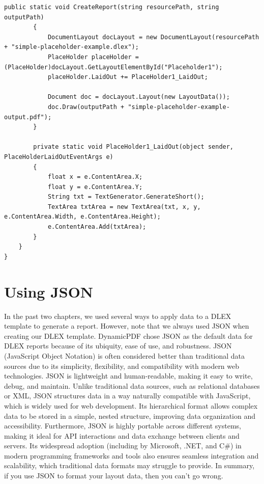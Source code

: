 \documentclass[american]{tufte-book}
\numberwithin{equation}{section}
\numberwithin{figure}{section}
\begin{document}
{{\begin{lstlisting}[caption={Report with placeholder.},label={lis:Report-with-placeholder.},basicstyle={\footnotesize\ttfamily},breaklines=true]
        public static void CreateReport(string resourcePath, string outputPath)
        {
            DocumentLayout docLayout = new DocumentLayout(resourcePath + "simple-placeholder-example.dlex");
            PlaceHolder placeHolder = (PlaceHolder)docLayout.GetLayoutElementById("Placeholder1");
            placeHolder.LaidOut += PlaceHolder1_LaidOut;
            
            Document doc = docLayout.Layout(new LayoutData());
            doc.Draw(outputPath + "simple-placeholder-example-output.pdf");
        }

        private static void PlaceHolder1_LaidOut(object sender, PlaceHolderLaidOutEventArgs e)
        {
            float x = e.ContentArea.X;
            float y = e.ContentArea.Y;
            String txt = TextGenerator.GenerateShort();
            TextArea txtArea = new TextArea(txt, x, y, e.ContentArea.Width, e.ContentArea.Height);
            e.ContentArea.Add(txtArea);
        }
    }
}
\end{lstlisting}
\leavevmode\egroup

\section{Using JSON}

In the past two chapters, we used several ways to apply data to a DLEX template to generate a report. However, note that we always used JSON when creating our DLEX template. DynamicPDF chose JSON as the default data for DLEX reports because of its ubiquity, ease of use, and robustness. JSON (JavaScript Object Notation) is often considered better than traditional data sources due to its simplicity, flexibility, and compatibility with modern web technologies. JSON is lightweight and human-readable, making it easy to write, debug, and maintain. Unlike traditional data sources, such as relational databases or XML, JSON structures data in a way naturally compatible with JavaScript, which is widely used for web development. Its hierarchical format allows complex data to be stored in a simple, nested structure, improving data organization and accessibility. Furthermore, JSON is highly portable across different systems, making it ideal for API interactions and data exchange between clients and servers. Its widespread adoption (including by Microsoft, .NET, and C\#) in modern programming frameworks and tools also ensures seamless integration and scalability, which traditional data formats may struggle to provide. In summary, if you use JSON to format your layout data, then you can't go wrong.

}}
\end{document}
